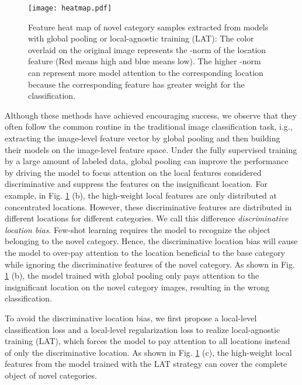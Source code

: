 \documentclass{article}
\begin{document}
\begin{figure}[t]
	\begin{center}
\texttt{[image: heatmap.pdf]}
	\end{center}
	\vspace{-15pt}
	\caption{Feature heat map of novel category samples extracted from models with global pooling or local-agnostic training (LAT): The color overlaid on the original image represents the -norm of the location feature (Red means high and blue means low). The higher -norm can represent more model attention to the corresponding location because the corresponding feature has greater weight for the classification.}
	\label{fig: heatmap}
	\vspace{-10pt}
\end{figure}


Although these methods have achieved encouraging success, we observe that they often follow the common routine in the traditional image classification task, i.g., extracting the image-level feature vector by global pooling \cite{lin2013network} and then building their models on the image-level feature space. Under the fully supervised training by a large amount of labeled data, global pooling can improve the performance by driving the model to focus attention on the local features considered discriminative and suppress the features on the insignificant location. For example, in Fig. \ref{fig: heatmap} (b), the high-weight local features are only distributed at concentrated locations. However, these discriminative features are distributed in different locations for different categories. We call this difference \textit{discriminative location bias}. Few-shot learning requires the model to recognize the object belonging to the novel category. Hence, the discriminative location bias will cause the model to over-pay attention to the location beneficial to the base category while ignoring the discriminative features of the novel category. As shown in Fig. \ref{fig: heatmap} (b), the model trained with global pooling only pays attention to the insignificant location on the novel category images, resulting in the wrong classification.

 
To avoid the discriminative location bias, we first propose a local-level classification loss and a local-level regularization loss to realize local-agnostic training (LAT), which forces the model to pay attention to all locations instead of only the discriminative location. As shown in Fig. \ref{fig: heatmap} (c), the high-weight local features from the model trained with the LAT strategy can cover the complete object of novel categories.
\end{document}
